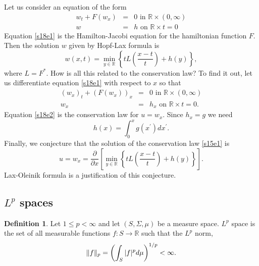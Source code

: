 \documentclass{article}
\DeclarePairedDelimiter\norm{\lVert}{\rVert}
\theoremstyle{plain}
\numberwithin{thm}{section}
\theoremstyle{plain}
\numberwithin{prop}{section}
\theoremstyle{definition}
\newtheorem{defn}{Definition}
\numberwithin{defn}{section}
\theoremstyle{remark}
\numberwithin{equation}{section}
\begin{document}
Let us consider an equation of the form
\begin{eqnarray}
w_t + F(w_x) &=& 0 \text{ in } \mathbb{R} \times (0, \infty) \label{s18e1} \\
w &=& h \text{ on } \mathbb{R} \times {t = 0} \nonumber
\end{eqnarray}
Equation \eqref{s18e1} is the Hamilton-Jacobi equation for the hamiltonian function $F$. Then the
solution $w$ given by Hopf-Lax formula is
\[
w(x, t) = \min_{y \in \mathbb{R}}\left\{tL\left(\frac{x - t}{t}\right) + h(y)\right\},
\]
where $L = F^\ast$. How is all this related to the conservation law? To find it out, let us 
differentiate equation \eqref{s18e1} with respect to $x$ so that
\begin{eqnarray}
(w_x)_t + (F(w_x))_x &=& 0 \text{ in } \mathbb{R} \times (0, \infty) \label{s18e2} \\
w_x &=& h_x \text{ on } \mathbb{R} \times {t = 0}. \nonumber
\end{eqnarray}
Equation \eqref{s18e2} is the conservation law for $u = w_x$. Since $h_x = g$ we need
\[
h(x) = \int_0^x g(x^\prime)dx^\prime.
\]
Finally, we conjecture that the solution of the conservation law \eqref{s15e1} is
\[
u = w_x = \frac{\partial}{\partial x}
\left[\min_{y \in \mathbb{R}}\left\{tL\left(\frac{x - t}{t}\right) + h(y)\right\}\right].
\]
Lax-Oleinik formula is a justification of this conjecture.

\subsection{$L^p$ spaces}
\begin{defn}\label{s18d1}
Let $1 \le p < \infty$ and let $(S, \Sigma, \mu)$ be a measure space. $L^p$ space is the set of all
measurable functions $f:S \rightarrow \mathbb{R}$ such that the $L^p$ norm,
\[
\norm{f}_p = \left(\int_S |f|^p d\mu\right)^{1/p} < \infty.
\]
\end{defn}
\end{document}
